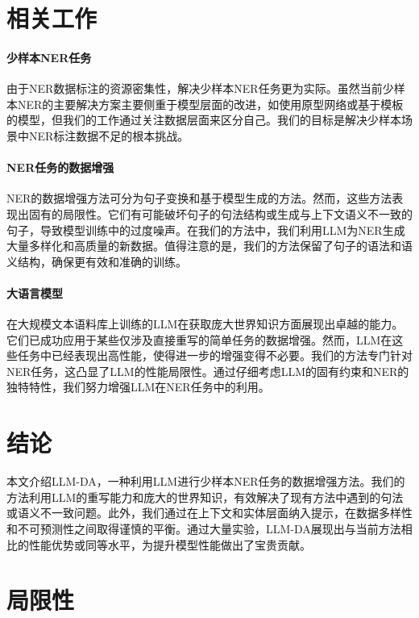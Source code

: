 \documentclass[supercite]{Experimental_Report}
\theoremstyle{definition}
\begin{document}
\section{相关工作}

\paragraph{少样本NER任务}
由于NER数据标注的资源密集性，解决少样本NER任务更为实际\cite{fritzler2019few,huang2020few,SNN,template_based,template_free}。虽然当前少样本NER的主要解决方案主要侧重于模型层面的改进，如使用原型网络或基于模板的模型，但我们的工作通过关注数据层面来区分自己。我们的目标是解决少样本场景中NER标注数据不足的根本挑战。

\paragraph{NER任务的数据增强}
NER的数据增强方法可分为句子变换和基于模型生成的方法\cite{LSMS,DAGA,MELM,LAMBADA,DA-intent,Auggpt}。然而，这些方法表现出固有的局限性。它们有可能破坏句子的句法结构或生成与上下文语义不一致的句子，导致模型训练中的过度噪声。在我们的方法中，我们利用LLM为NER生成大量多样化和高质量的新数据。值得注意的是，我们的方法保留了句子的语法和语义结构，确保更有效和准确的训练。

\paragraph{大语言模型}
在大规模文本语料库上训练的LLM在获取庞大世界知识方面展现出卓越的能力。它们已成功应用于某些仅涉及直接重写的简单任务的数据增强。然而，LLM在这些任务中已经表现出高性能，使得进一步的增强变得不必要。我们的方法专门针对NER任务，这凸显了LLM的性能局限性。通过仔细考虑LLM的固有约束和NER的独特特性，我们努力增强LLM在NER任务中的利用。

\section{结论}

本文介绍LLM-DA，一种利用LLM进行少样本NER任务的数据增强方法。我们的方法利用LLM的重写能力和庞大的世界知识，有效解决了现有方法中遇到的句法或语义不一致问题。此外，我们通过在上下文和实体层面纳入提示，在数据多样性和不可预测性之间取得谨慎的平衡。通过大量实验，LLM-DA展现出与当前方法相比的性能优势或同等水平，为提升模型性能做出了宝贵贡献。

\section*{局限性}
\end{document}

